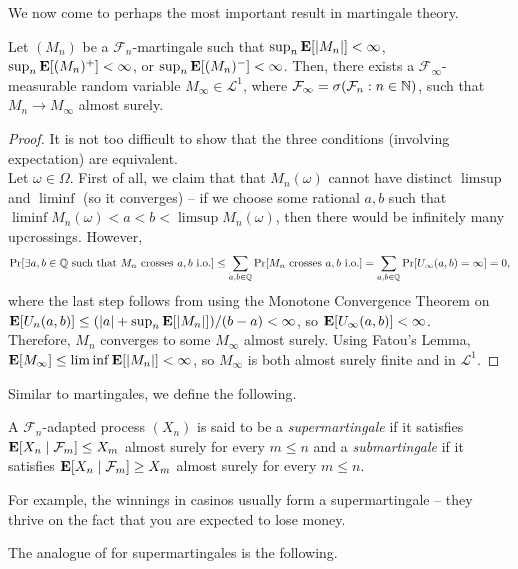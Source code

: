 		We now come to perhaps the most important result in martingale theory.

		\begin{ftheo}
			\label{martingale convergence theorem}
			Let $(M_n)$ be a $\mathcal{F}_n$-martingale such that $\sup_n\textbf{E}[|M_n|]<\infty$, $\sup_n\textbf{E}[(M_n)^+]<\infty$, or $\sup_n\textbf{E}[(M_n)^-]<\infty$. Then, there exists a $\mathcal{F}_\infty$-measurable random variable $M_\infty\in\mathcal{L}^1$, where $\mathcal{F}_\infty = \sigma(\mathcal{F}_n : n\in\mathbb{N})$, such that $M_n\to M_\infty$ almost surely.
		\end{ftheo}
		\begin{proof}
			It is not too difficult to show that the three conditions (involving expectation) are equivalent.\\
			Let $\omega\in\Omega$. First of all, we claim that that $M_n(\omega)$ cannot have distinct $\limsup$ and $\liminf$ (so it converges) -- if we choose some rational $a,b$ such that $\liminf M_n(\omega)<a<b<\limsup M_n(\omega)$, then there would be infinitely many upcrossings. However,
			\[ \Pr[\exists a,b\in\mathbb{Q}\text{ such that $M_n$ crosses $a,b$ i.o.}] \leq \sum_{a,b\in\mathbb{Q}} \Pr[M_n\text{ crosses $a,b$ i.o.}] = \sum_{a,b\in\mathbb{Q}}\Pr[U_\infty(a,b)=\infty] = 0, \]
			where the last step follows from using the Monotone Convergence Theorem on $\textbf{E}[U_n(a,b)] \leq (|a|+\sup_n\textbf{E}[|M_n|])/(b-a) < \infty$, so $\textbf{E}[U_\infty(a,b)]<\infty$.\\
			Therefore, $M_n$ converges to some $M_\infty$ almost surely. Using Fatou's Lemma, $\textbf{E}[M_\infty] \leq \liminf \textbf{E}[|M_n|] < \infty$, so $M_\infty$ is both almost surely finite and in $\mathcal{L}^1$.
		\end{proof}

		Similar to martingales, we define the following.

		\begin{definition}
			A $\mathcal{F}_n$-adapted process $(X_n)$ is said to be a \textit{supermartingale} if it satisfies $\textbf{E}[X_n\mid\mathcal{F}_m] \leq X_m$ almost surely for every $m\leq n$ and a \textit{submartingale} if it satisfies $\textbf{E}[X_n\mid\mathcal{F}_m] \geq X_m$ almost surely for every $m\leq n$. 
		\end{definition}

		For example, the winnings in casinos usually form a supermartingale -- they thrive on the fact that you are expected to lose money.

		The analogue of  for supermartingales is the following.

